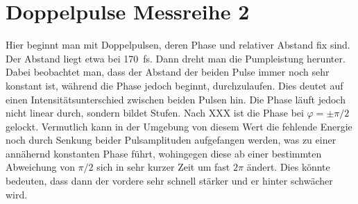 \documentclass[bachelor,       %
               twoside,        %
               BCOR10mm,       %
               english,ngerman, %
               ]{GAUBM}
\begin{document}
\section{Doppelpulse Messreihe 2}
Hier beginnt man mit Doppelpulsen, deren Phase und relativer Abstand fix sind.
Der Abstand liegt etwa bei 170 \,fs.
Dann dreht man die Pumpleistung herunter.
Dabei beobachtet man, dass der Abstand der beiden Pulse immer noch sehr konstant ist, während die Phase jedoch beginnt, durchzulaufen.
Dies deutet auf einen Intensitätsunterschied zwischen beiden Pulsen hin.
Die Phase läuft jedoch nicht linear durch, sondern bildet Stufen.
Nach XXX ist die Phase bei $\varphi=\pm\pi/2$ gelockt.
Vermutlich kann in der Umgebung von diesem Wert die fehlende Energie noch durch Senkung beider Pulsamplituden aufgefangen werden, was zu einer annähernd konstanten Phase führt, wohingegen diese ab einer bestimmten Abweichung von $\pi/2$ sich in sehr kurzer Zeit um fast $2\pi$ ändert.
Dies könnte bedeuten, dass dann der vordere sehr schnell stärker und er hinter schwächer wird. 
\end{document}
